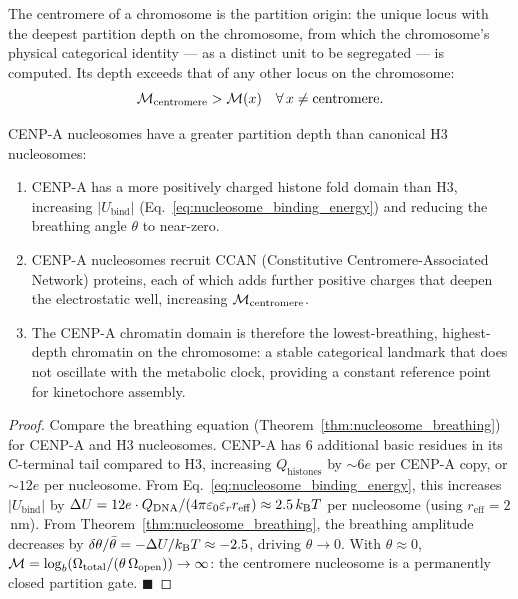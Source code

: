 \begin{definition}
\label{def:centromere_partition_origin}
The centromere of a chromosome is the partition origin: the unique locus with
the deepest partition depth on the chromosome, from which the chromosome's
physical categorical identity --- as a distinct unit to be segregated ---
is computed. Its depth exceeds that of any other locus on the chromosome:
\begin{equation}
  \mathcal{M}_{\mathrm{centromere}} > \mathcal{M}(x) \quad \forall\, x \neq \mathrm{centromere}.
  \label{eq:centromere_maxdepth}
\end{equation}
\end{definition}

\begin{theorem}
\label{thm:cenpa_deepest}
CENP-A nucleosomes have a greater partition depth than canonical H3 nucleosomes:
\begin{enumerate}[label=(\roman*)]
  \item CENP-A has a more positively charged histone fold domain than H3,
        increasing $|U_{\mathrm{bind}}|$ (Eq.~\eqref{eq:nucleosome_binding_energy})
        and reducing the breathing angle $\theta$ to near-zero.
  \item CENP-A nucleosomes recruit CCAN (Constitutive Centromere-Associated
        Network) proteins, each of which adds further positive charges that
        deepen the electrostatic well, increasing $\mathcal{M}_{\mathrm{centromere}}$.
  \item The CENP-A chromatin domain is therefore the lowest-breathing, highest-depth
        chromatin on the chromosome: a stable categorical landmark that does
        not oscillate with the metabolic clock, providing a constant reference
        point for kinetochore assembly.
\end{enumerate}
\end{theorem}

\begin{proof}
Compare the breathing equation (Theorem~\ref{thm:nucleosome_breathing}) for
CENP-A and H3 nucleosomes. CENP-A has 6 additional basic residues in its
C-terminal tail compared to H3, increasing $Q_{\mathrm{histones}}$ by
$\sim 6e$ per CENP-A copy, or $\sim 12e$ per nucleosome. From
Eq.~\eqref{eq:nucleosome_binding_energy}, this increases $|U_{\mathrm{bind}}|$
by $\Delta U = 12e \cdot Q_{\mathrm{DNA}} / (4\pi\varepsilon_0\varepsilon_r r_{\mathrm{eff}})
\approx 2.5\,k_{\mathrm{B}} T$ per nucleosome (using $r_{\mathrm{eff}} = 2$\,nm).
From Theorem~\ref{thm:nucleosome_breathing}, the breathing amplitude decreases
by $\delta\theta/\bar\theta = -\Delta U/k_{\mathrm{B}} T \approx -2.5$, driving
$\theta \to 0$. With $\theta \approx 0$, $\mathcal{M} = \log_b(\Omega_{\rm total}/(\theta\,\Omega_{\rm open})) \to \infty$:
the centromere nucleosome is a permanently closed partition gate. $\blacksquare$
\end{proof}

